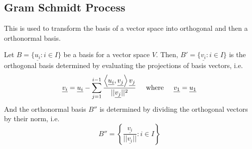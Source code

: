 \documentclass{article}
\begin{document}
\newpage

\subsection{Gram Schmidt Process}

This is used to transform the basis of a vector space into orthogonal and then a orthonormal basis. 

Let $B = \{\underline{u_i}: i \in I\}$ be a basis for a vector space $V$. Then, $B' = \{\underline{v_i}: i \in I\}$ is the orthogonal basis determined by evaluating the projections of basis vectors, i.e.
$$\underline{v_i} = \underline{u_i} - \sum_{j=1}^{i-1} \frac{\left<\underline{u_i}, \underline{v_j}\right> \underline{v_j}}{||\underline{v_j}||^2}  \hspace{0.5cm} \text{where} \hspace{0.5cm} \underline{v_1} = \underline{u_1}$$
And the orthonormal basis $B''$ is determined by dividing the orthogonal vectors by their norm, i.e.
$$B'' = \left\{ \frac{\underline{v_i}}{||\underline{v_i}||}: i \in I\right\}$$
\end{document}
